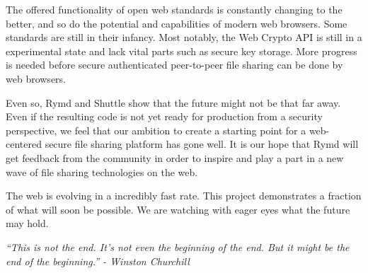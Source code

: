 The offered functionality of open web standards is constantly changing to the better, and so do the potential and capabilities of modern web browsers. Some standards are still in their infancy. Most notably, the Web Crypto API is still in a experimental state and lack vital parts such as secure key storage. More progress is needed before secure authenticated peer-to-peer file sharing can be done by web browsers.

Even so, Rymd and Shuttle show that the future might not be that far away. Even if the resulting code is not yet ready for production from a security perspective, we feel that our ambition to create a starting point for a web-centered secure file sharing platform has gone well. It is our hope that Rymd will get feedback from the community in order to inspire and play a part in a new wave of file sharing technologies on the web.

The web is evolving in a incredibly fast rate. This project demonstrates a fraction of what will soon be possible. We are watching with eager eyes what the future may hold.

\emph{``This is not the end. It's not even the beginning of the end. But it might be the end of the beginning.'' - Winston Churchill}
